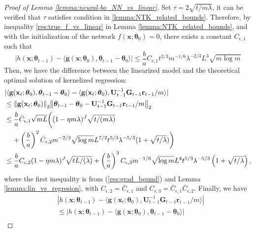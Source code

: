 \begin{proof}[Proof of Lemma \ref{lemma:neural-bo_NN_vs_linear}]

Set $\tau=2\sqrt{t/m\lambda}$, it can be verified that $\tau$ satisfies condition in \ref{lemma:NTK_related_bounds}. Therefore,  by inequality \eqref{res:true_f_vs_linear} in Lemma \ref{lemma:NTK_related_bounds}, and with the initialization of the network $f(\mathbf{x};\boldsymbol{\theta}_0) = 0$, there exists a constant $C_{\epsilon,1}$ such that
\[\left \lvert h(\mathbf{x}; \boldsymbol{\theta}_{t-1}) - \langle \mathbf{g}(\mathbf{x}; \boldsymbol{\theta}_0), \boldsymbol{\theta}_{t-1} - \boldsymbol{\theta}_0 \rangle  \right\rvert  \leq  \frac{b}{a} C_{\epsilon,1}   t^{2/3}m^{-1/6}\lambda^{-2/3} L^{3}\sqrt{m\log m} \]
Then, we have the difference between the linearized model and the theoretical optimal solution of kernelized regression:
\begin{align*}
        & \lvert \langle\mathbf{g}(\mathbf{x}_{t};\boldsymbol{\theta}_{0}),\boldsymbol{\theta}_{t-1}-\boldsymbol{\theta}_{0}\rangle-\langle\mathbf{g}(\mathbf{x}_{t};\boldsymbol{\theta}_{0}),\mathbf{U}_{t-1}^{-1}\mathbf{G}_{t-1}\mathbf{r}_{t-1}/m\rangle \rvert \\
        & \leq \norm{\mathbf{g}(\mathbf{x}_t;\boldsymbol{\theta}_0)}_2 \norm{\boldsymbol{\theta}_{t-1}-\boldsymbol{\theta}_{0} - \mathbf{U}_{t-1}^{-1}\mathbf{G}_{t-1}\mathbf{r}_{t-1}/m}_2\\
        & \le \frac{b}{a} \Bar{C}_{\epsilon,1} \sqrt{mL} \bigg((1-\eta m\lambda)^{J}\sqrt{t/(m\lambda)} \\ & \;\;\;\; +\left(\frac{b}{a}\right)^2 \Bar{C}_{\epsilon, 2}m^{-2/3}\sqrt{\log m}L^{7/2}t^{5/3}\lambda^{-5/3}(1+\sqrt{t/\lambda}) \bigg)\\
        & \le \frac{b}{a} C_{\epsilon,2} (1-\eta m\lambda)^{J} \sqrt{tL/(\lambda)} +  \left(\frac{b}{a} \right)^3 C_{\epsilon,3} m^{-1/6} \sqrt{\log m} L^4 t^{5/3} \lambda ^{-5/3} \left(1 + \sqrt{t/\lambda} \right),
\end{align*}
where the first inequality is from (\ref{res:grad_bound}) and Lemma \ref{lemma:lin_vs_regresion}, with $C_{\epsilon,2} = \bar C_{\epsilon,1}$ and  $C_{\epsilon,3} = \bar C_{\epsilon,1} \bar C_{\epsilon,2}$.
Finally, we have 
\begin{align*}
        & \left \lvert h(\mathbf{x}; \boldsymbol{\theta}_{t-1}) - \langle \mathbf{g}(\mathbf{x}_{t};\boldsymbol{\theta}_{0}),\mathbf{U}_{t-1}^{-1}\mathbf{G}_{t-1}\mathbf{r}_{t-1}/m\rangle \right\rvert \\
        & \leq  \left \lvert h(\mathbf{x}; \boldsymbol{\theta}_{t-1}) - \langle \mathbf{g}(\mathbf{x}; \boldsymbol{\theta}_0), \boldsymbol{\theta}_{t-1} - \boldsymbol{\theta}_0 \rangle  \right\rvert \\ 

\end{align*}
\end{proof}
